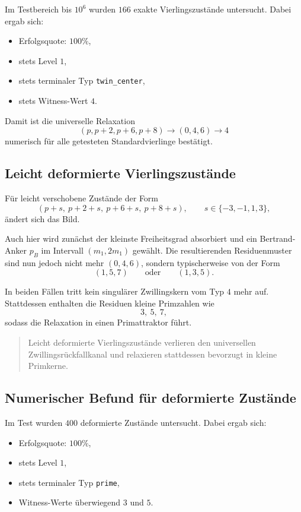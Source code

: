 \documentclass[11pt,a4paper]{article}
\theoremstyle{definition}
\theoremstyle{plain}
\theoremstyle{remark}
\begin{document}
	Im Testbereich bis \(10^6\) wurden \(166\) exakte Vierlingszustände untersucht. 
	Dabei ergab sich:
	
	\begin{itemize}
		\item Erfolgsquote: \(100\%\),
		\item stets Level \(1\),
		\item stets terminaler Typ \texttt{twin\_center},
		\item stets Witness-Wert \(4\).
	\end{itemize}
	
	Damit ist die universelle Relaxation
	\[
	(p,p+2,p+6,p+8)\longrightarrow (0,4,6)\longrightarrow 4
	\]
	numerisch für alle getesteten Standardvierlinge bestätigt.
	
	\subsection{Leicht deformierte Vierlingszustände}
	
	Für leicht verschobene Zustände der Form
	\[
	(p+s,\ p+2+s,\ p+6+s,\ p+8+s),
	\qquad
	s\in\{-3,-1,1,3\},
	\]
	ändert sich das Bild.
	
	Auch hier wird zunächst der kleinste Freiheitsgrad absorbiert und ein Bertrand-Anker \(p_B\) im Intervall \((m_1,2m_1)\) gewählt. 
	Die resultierenden Residuenmuster sind nun jedoch nicht mehr \((0,4,6)\), sondern typischerweise von der Form
	\[
	(1,5,7)
	\qquad\text{oder}\qquad
	(1,3,5).
	\]
	
	In beiden Fällen tritt kein singulärer Zwillingskern vom Typ \(4\) mehr auf. 
	Stattdessen enthalten die Residuen kleine Primzahlen wie
	\[
	3,\ 5,\ 7,
	\]
	sodass die Relaxation in einen Primattraktor führt.
	
	\begin{quote}
		Leicht deformierte Vierlingszustände verlieren den universellen Zwillingsrückfallkanal und relaxieren stattdessen bevorzugt in kleine Primkerne.
	\end{quote}
	
	\subsection{Numerischer Befund für deformierte Zustände}
	
	Im Test wurden \(400\) deformierte Zustände untersucht. 
	Dabei ergab sich:
	
	\begin{itemize}
		\item Erfolgsquote: \(100\%\),
		\item stets Level \(1\),
		\item stets terminaler Typ \texttt{prime},
		\item Witness-Werte überwiegend \(3\) und \(5\).
	\end{itemize}
	
\end{document}
